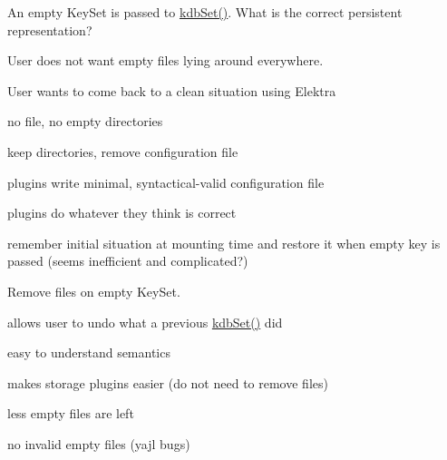 An empty Key\+Set is passed to \hyperlink{group__kdb_ga11436b058408f83d303ca5e996832bcf}{kdb\+Set()}. What is the correct persistent representation?


\begin{DoxyItemize}
\item User does not want empty files lying around everywhere.
\item User wants to come back to a clean situation using Elektra
\end{DoxyItemize}


\begin{DoxyItemize}
\item no file, no empty directories
\item keep directories, remove configuration file
\item plugins write minimal, syntactical-\/valid configuration file
\item plugins do whatever they think is correct
\item remember initial situation at mounting time and restore it when empty key is passed (seems inefficient and complicated?)
\end{DoxyItemize}

Remove files on empty Key\+Set.


\begin{DoxyItemize}
\item allows user to undo what a previous \hyperlink{group__kdb_ga11436b058408f83d303ca5e996832bcf}{kdb\+Set()} did
\item easy to understand semantics
\item makes storage plugins easier (do not need to remove files)
\end{DoxyItemize}


\begin{DoxyItemize}
\item less empty files are left
\item no invalid empty files (yajl bugs)
\end{DoxyItemize}